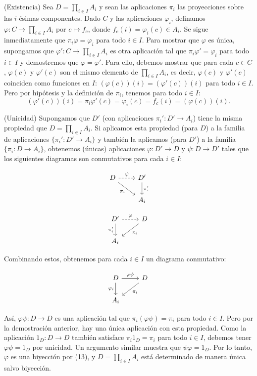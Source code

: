 \begin{proofbox}
    (Existencia) Sea $D = \prod_{i \in I} A_i$ y sean las aplicaciones $\pi_i$ las proyecciones sobre las $i$-ésimas componentes. Dado $C$ y las aplicaciones $\varphi_i$, definamos $\varphi: C \to \prod_{i \in I} A_i$ por $c \mapsto f_c$, donde $f_c(i) = \varphi_i(c) \in A_i$. Se sigue inmediatamente que $\pi_i \varphi = \varphi_i$ para todo $i \in I$. Para mostrar que $\varphi$ es única, supongamos que $\varphi': C \to \prod_{i \in I} A_i$ es otra aplicación tal que $\pi_i \varphi' = \varphi_i$ para todo $i \in I$ y demostremos que $\varphi = \varphi'$. Para ello, debemos mostrar que para cada $c \in C$, $\varphi(c)$ y $\varphi'(c)$ son el mismo elemento de $\prod_{i \in I} A_i$, es decir, $\varphi(c)$ y $\varphi'(c)$ coinciden como funciones en $I$: $(\varphi(c))(i) = (\varphi'(c))(i)$ para todo $i \in I$. Pero por hipótesis y la definición de $\pi_i$, tenemos para todo $i \in I$:
    \[
    (\varphi'(c))(i) = \pi_i \varphi'(c) = \varphi_i(c) = f_c(i) = (\varphi(c))(i).
    \]

    (Unicidad) Supongamos que $D'$ (con aplicaciones $\pi_i': D' \to A_i$) tiene la misma propiedad que $D = \prod_{i \in I} A_i$. Si aplicamos esta propiedad (para $D$) a la familia de aplicaciones $\{\pi_i': D' \to A_i\}$ y también la aplicamos (para $D'$) a la familia $\{\pi_i: D \to A_i\}$, obtenemos (únicas) aplicaciones $\varphi: D' \to D$ y $\psi: D \to D'$ tales que los siguientes diagramas son conmutativos para cada $i \in I$:

    \[
        \begin{tikzcd}
        D \arrow[swap]{dr}{\pi_i} \arrow[dashed]{r}{\psi} & D' \arrow{d}{\pi_i'} \\
        & A_i
        \end{tikzcd}
    \]

    \[
        \begin{tikzcd}
        D' \arrow[swap]{d}{\pi_i'} \arrow[dashed]{r}{\varphi} & D \arrow{dl}{\pi_i} \\
        A_i
        \end{tikzcd}
    \]

    Combinando estos, obtenemos para cada $i \in I$ un diagrama conmutativo:

    \[
        \begin{tikzcd}
        D \arrow[swap]{d}{\varphi_i} \arrow{r}{\varphi \psi} & D \arrow{dl}{\pi_i} \\
        A_i
        \end{tikzcd}
    \]

    Así, $\varphi \psi: D \to D$ es una aplicación tal que $\pi_i (\varphi \psi) = \pi_i$ para todo $i \in I$. Pero por la demostración anterior, hay una única aplicación con esta propiedad. Como la aplicación $1_D: D \to D$ también satisface $\pi_i 1_D = \pi_i$ para todo $i \in I$, debemos tener $\varphi \psi = 1_D$ por unicidad. Un argumento similar muestra que $\psi \varphi = 1_D$. Por lo tanto, $\varphi$ es una biyección por (13), y $D = \prod_{i \in I} A_i$ está determinado de manera única salvo biyección.
\end{proofbox}

